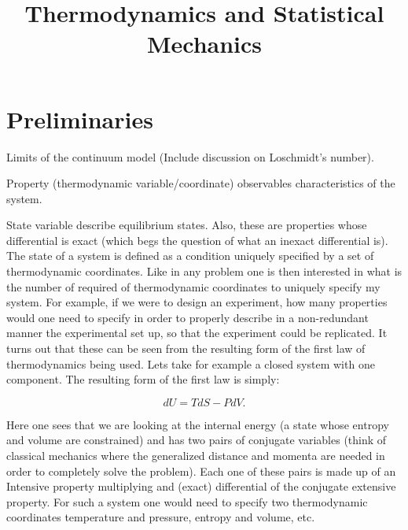 \documentclass[10pt,twoside,openright]{memoir}
\title{Thermodynamics and Statistical Mechanics}
\date{}
\makeatletter
\def\maketitle{%
  \null
  \thispagestyle{empty}%
  \vfill
  \begin{center}\leavevmode
    \normalfont
    {\LARGE\raggedleft \@author\par}%
    \hrulefill\par
    {\huge\raggedright \@title\par}%
    \vskip 1cm
  \end{center}%
  \vfill
  \null
  \cleardoublepage
  }
\makeatother
\begin{document}
\let\cleardoublepage\clearpage


\maketitle










\mainmatter
\sloppy




\chapter{Preliminaries}

Limits of the continuum model (Include discussion on Loschmidt's number).

Property (thermodynamic variable/coordinate) observables characteristics of the system.

State variable describe equilibrium states. Also, these are properties whose differential is exact (which begs the question of what an inexact differential is). 
The state of a system is defined as a condition uniquely specified by a set of thermodynamic coordinates. 
Like in any problem one is then interested in what is the number of required of thermodynamic coordinates to uniquely specify my system.
For example, if we were to design an experiment, how many properties would one need to specify in order to properly describe in a non-redundant manner the experimental set up, so that the experiment could be replicated.
It turns out that these can be seen from the resulting form of the first law of thermodynamics being used.
Lets take for example a closed system with one component. The resulting form of the first law is simply:

\begin{equation}
dU = TdS - PdV.
\end{equation}

Here one sees that we are looking at the internal energy (a state whose entropy and volume are constrained) and has two pairs of conjugate variables (think of classical mechanics where the generalized distance and momenta are needed in order to completely solve the problem). 
Each one of these pairs is made up of an Intensive property multiplying and (exact) differential of the conjugate extensive property. 
For such a system one would need to specify two thermodynamic coordinates temperature and pressure, entropy and volume, etc. 
\end{document}
